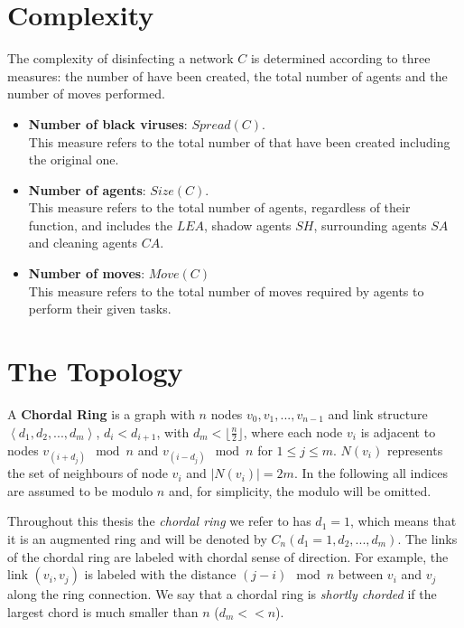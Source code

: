 \section{Complexity}
The complexity of disinfecting a network $C$ is determined according to three measures: 
the number of \bvs have been created, the total number of agents and the number of moves performed.
\begin{itemize}
\item {\bf Number of black viruses}:  $Spread(C)$.\\ 
This measure refers to the total number of \bvs that have been created including the original one.
\item {\bf Number of agents}:  $Size(C)$. \\
This measure refers to the total number of  agents, regardless of their function, and includes the $LEA$, shadow agents $SH$, surrounding agents $SA$ and cleaning agents $CA$. 



\item {\bf Number of moves}: $Move(C)$ \\
This measure refers to the total number of moves required by agents to perform their given tasks.

\end{itemize}



\section{The Topology}
A {\bf  Chordal Ring} is a graph  with   $n$ nodes $v_{0},v_{1},...,v_{n-1}$ and link structure
$\left\langle d_{1}, d_{2}, ..., d_{m}\right\rangle$, $d_{i} < d_{i+1}$, with  $d_m < \lfloor \frac{n}{2} \rfloor $, where
each node $v_{i}$ is adjacent to   nodes $v_{(i+d_{j})}\mod n$ and $v_{(i-d_{j})}\mod n$ for $1\leq j\leq m$.
 $N(v_i)$  represents the set of neighbours of node $v_i$ and $|N(v_i)|=2m$. 
In the following  all indices are assumed to be modulo $n$ and, for simplicity, the modulo will be omitted.



Throughout this thesis the {\it chordal ring} we refer to has $d_{1}=1$, which means that
it is an augmented ring and will be denoted by $C_n( d_1=1, d_{2}, ..., d_{m})$. 
The links of the chordal ring are labeled with chordal sense of direction. For example, the link $(v_i,v_j)$ is labeled with the distance $(j-i) \mod n$ between
$v_i$ and $v_j$ along the ring connection.
We say that a chordal ring is   {\em shortly chorded} if the largest chord is much smaller than $n$
($d_m<<n$).

